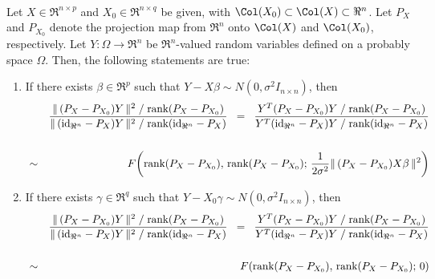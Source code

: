 \documentclass{article}
\newcommand{\rank}{\textnormal{rank}}
\newcommand{\id}{\textnormal{id}}
\begin{document}
\begin{theorem}\mbox{}\\
Let $X \in \Re^{n \times p}$ and $X_{0} \in \Re^{n \times q}$ be given, with $\Col(X_{0}) \subset \Col(X) \subset \Re^{n}$.  Let $P_{X}$ and $P_{X_{0}}$ denote the projection map from $\Re^{n}$ onto $\Col(X)$ and $\Col(X_{0})$, respectively.  Let $Y : \Omega \longrightarrow \Re^{n}$ be $\Re^{n}$-valued random variables defined on a probably space $\Omega$.  Then, the following statements are true:

\begin{enumerate}

\item  If there exists $\beta \in \Re^{p}$ such that $Y - X\beta \sim N(0,\sigma^{2}I_{n \times n})$, then
\begin{eqnarray*}
&&\dfrac{\Vert\,(P_{X}-P_{X_{0}})Y\,\Vert^{2}\;/\;\rank(P_{X}-P_{X_{0}})}{\Vert\,(\id_{\Re^{n}}-P_{X})Y\,\Vert^{2}\;/\;\rank(\id_{\Re^{n}}-P_{X})}
\;\;=\;\;\dfrac{Y^{T}(P_{X}-P_{X_{0}})Y\;/\;\rank(P_{X}-P_{X_{0}})}{Y^{T}(\id_{\Re^{n}}-P_{X})Y\;/\;\rank(\id_{\Re^{n}}-P_{X})}
\\ \\
&\sim&
F\!\left(\rank(P_{X}-P_{X_{0}}),\,\rank(P_{X}-P_{X_{0}});\,\frac{1}{2\sigma^{2}}\Vert\,(P_{X}-P_{X_{0}})X\beta\,\Vert^{2}\right)
\end{eqnarray*}

\item  If there exists $\gamma \in \Re^{q}$ such that $Y - X_{0}\gamma \sim N(0,\sigma^{2}I_{n \times n})$, then
\begin{eqnarray*}
&&\dfrac{\Vert\,(P_{X}-P_{X_{0}})Y\,\Vert^{2}\;/\;\rank(P_{X}-P_{X_{0}})}{\Vert\,(\id_{\Re^{n}}-P_{X})Y\,\Vert^{2}\;/\;\rank(\id_{\Re^{n}}-P_{X})}
\;\;=\;\;\dfrac{Y^{T}(P_{X}-P_{X_{0}})Y\;/\;\rank(P_{X}-P_{X_{0}})}{Y^{T}(\id_{\Re^{n}}-P_{X})Y\;/\;\rank(\id_{\Re^{n}}-P_{X})}
\\ \\
&\sim&
F\!\left(\rank(P_{X}-P_{X_{0}}),\,\rank(P_{X}-P_{X_{0}});\,0\right)
\end{eqnarray*}

\end{enumerate}

\end{theorem}
\end{document}
